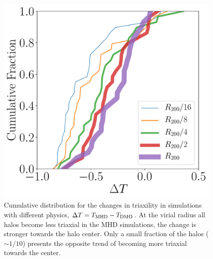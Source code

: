 \documentclass[usenatbib]{mnras}
\begin{document}
\begin{figure}
\includegraphics[width=0.9\columnwidth]{delta_triaxiality_distro.pdf}
\caption{
  Cumulative distribution for the changes in triaxility in simulations
  with different physics, $\Delta T=T_{\rm MHD}-T_{\rm DMO}$.
  At the virial radius all halos become less triaxial in the MHD
  simulations, the change is stronger towards the halo center.
  Only a small fraction of the halos ($\sim 1/10$) presents the
  opposite trend of becoming more triaxial towards the center.}
\label{fig:delta_triaxial_cumulative}
\end{figure}
\end{document}
